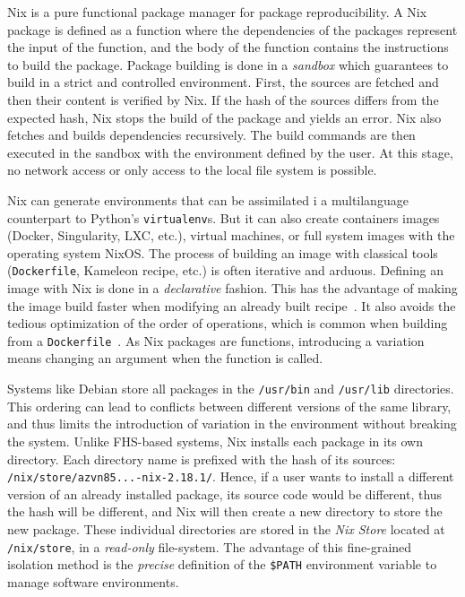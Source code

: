 \documentclass[sigconf,natbib=false]{acmart}
\begin{document}
Nix is a pure functional package manager for package reproducibility.
A Nix package is defined as a function where the dependencies of the packages represent the input of the function, and the body of the function contains the instructions to build the package.
Package building is done in a \emph{sandbox} which guarantees to build in a strict and controlled environment.
First, the sources are fetched and then their content is verified by Nix.
If the hash of the sources differs from the expected hash, Nix stops the build of the package and yields an error.
Nix also fetches and builds dependencies recursively.
The build commands are then executed in the sandbox with the environment defined by the user.
At this stage, no network access or only access to the local file system is possible.

Nix can generate environments that can be assimilated i a multilanguage counterpart to Python's \texttt{virtualenv}s.
But it can also create containers images (Docker, Singularity, LXC, etc.), virtual machines, or full system images with the operating system NixOS.
The process of building an image with classical tools (\texttt{Dockerfile}, Kameleon recipe, etc.) is often iterative and arduous.
Defining an image with Nix is done in a \emph{declarative} fashion.
This has the advantage of making the image build faster when modifying an already built recipe\ \cite{nxc}.
It also avoids the tedious optimization of the order of operations, which is common when building from a \texttt{Dockerfile}\ \cite{docker_cache}. 
As Nix packages are functions, introducing a variation means changing an argument when the function is called.

Systems like Debian store all packages in the \texttt{/usr/bin} and \texttt{/usr/lib} directories.
This ordering can lead to conflicts between different versions of the same library, and thus limits the introduction of variation in the environment without breaking the system.
Unlike FHS-based systems, Nix installs each package in its own directory.
Each directory name is prefixed with the hash of its sources: \texttt{/nix/store/azvn85...-nix-2.18.1/}.
Hence, if a user wants to install a different version of an already installed package, its source code would be different, thus the hash will be different, and Nix will then create a new directory to store the new package.
These individual directories are stored in the \emph{Nix Store} located at \texttt{/nix/store}, in a \emph{read-only} file-system.
The advantage of this fine-grained isolation method is the \emph{precise} definition of the \texttt{\$PATH} environment variable to manage software environments.
\end{document}
